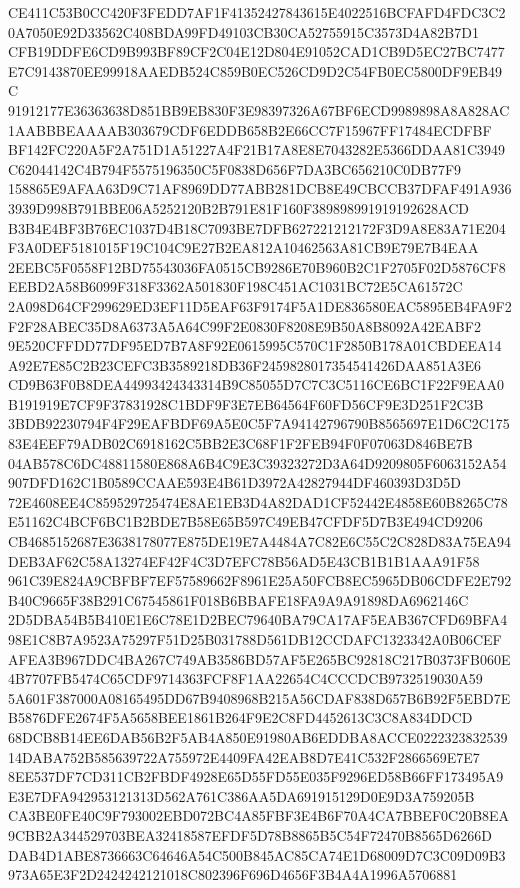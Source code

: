 \documentclass[UTF8,fontset=fandol,zihao=-4,a4paper]{ctexart}
\begin{document}
{{CE411C53B0CC420F3FEDD7AF1F41352427843615E4022516BCFAFD4FDC3C20A7050E92D33562C408BDA99FD49103CB30CA52755915C3573D4A82B7D1
CFB19DDFE6CD9B993BF89CF2C04E12D804E91052CAD1CB9D5EC27BC7477E7C9143870EE99918AAEDB524C859B0EC526CD9D2C54FB0EC5800DF9EB49C
91912177E36363638D851BB9EB830F3E98397326A67BF6ECD9989898A8A828AC1AABBBEAAAAB303679CDF6EDDB658B2E66CC7F15967FF17484ECDFBF
BF142FC220A5F2A751D1A51227A4F21B17A8E8E7043282E5366DDAA81C3949C62044142C4B794F5575196350C5F0838D656F7DA3BC656210C0DB77F9
158865E9AFAA63D9C71AF8969DD77ABB281DCB8E49CBCCB37DFAF491A9363939D998B791BBE06A5252120B2B791E81F160F389898991919192628ACD
B3B4E4BF3B76EC1037D4B18C7093BE7DFB627221212172F3D9A8E83A71E204F3A0DEF5181015F19C104C9E27B2EA812A10462563A81CB9E79E7B4EAA
2EEBC5F0558F12BD75543036FA0515CB9286E70B960B2C1F2705F02D5876CF8EEBD2A58B6099F318F3362A501830F198C451AC1031BC72E5CA61572C
2A098D64CF299629ED3EF11D5EAF63F9174F5A1DE836580EAC5895EB4FA9F2F2F28ABEC35D8A6373A5A64C99F2E0830F8208E9B50A8B8092A42EABF2
9E520CFFDD77DF95ED7B7A8F92E0615995C570C1F2850B178A01CBDEEA14A92E7E85C2B23CEFC3B3589218DB36F2459828017354541426DAA851A3E6
CD9B63F0B8DEA44993424343314B9C85055D7C7C3C5116CE6BC1F22F9EAA0B191919E7CF9F37831928C1BDF9F3E7EB64564F60FD56CF9E3D251F2C3B
3BDB92230794F4F29EAFBDF69A5E0C5F7A94142796790B8565697E1D6C2C17583E4EEF79ADB02C6918162C5BB2E3C68F1F2FEB94F0F07063D846BE7B
04AB578C6DC48811580E868A6B4C9E3C39323272D3A64D9209805F6063152A54907DFD162C1B0589CCAAE593E4B61D3972A42827944DF460393D3D5D
72E4608EE4C859529725474E8AE1EB3D4A82DAD1CF52442E4858E60B8265C78E51162C4BCF6BC1B2BDE7B58E65B597C49EB47CFDF5D7B3E494CD9206
CB4685152687E3638178077E875DE19E7A4484A7C82E6C55C2C828D83A75EA94DEB3AF62C58A13274EF42F4C3D7EFC78B56AD5E43CB1B1B1AAA91F58
961C39E824A9CBFBF7EF57589662F8961E25A50FCB8EC5965DB06CDFE2E792B40C9665F38B291C67545861F018B6BBAFE18FA9A9A91898DA6962146C
2D5DBA54B5B410E1E6C78E1D2BEC79640BA79CA17AF5EAB367CFD69BFA498E1C8B7A9523A75297F51D25B031788D561DB12CCDAFC1323342A0B06CEF
AFEA3B967DDC4BA267C749AB3586BD57AF5E265BC92818C217B0373FB060E4B7707FB5474C65CDF9714363FCF8F1AA22654C4CCCDCB9732519030A59
5A601F387000A08165495DD67B9408968B215A56CDAF838D657B6B92F5EBD7EB5876DFE2674F5A5658BEE1861B264F9E2C8FD4452613C3C8A834DDCD
68DCB8B14EE6DAB56B2F5AB4A850E91980AB6EDDBA8ACCE022232383253914DABA752B585639722A755972E4409FA42EAB8D7E41C532F2866569E7E7
8EE537DF7CD311CB2FBDF4928E65D55FD55E035F9296ED58B66FF173495A9E3E7DFA942953121313D562A761C386AA5DA691915129D0E9D3A759205B
CA3BE0FE40C9F793002EBD072BC4A85FBF3E4B6F70A4CA7BBEF0C20B8EA9CBB2A344529703BEA32418587EFDF5D78B8865B5C54F72470B8565D6266D
DAB4D1ABE8736663C64646A54C500B845AC85CA74E1D68009D7C3C09D09B3973A65E3F2D2424242121018C802396F696D4656F3B4A4A1996A5706881
}}
\end{document}
